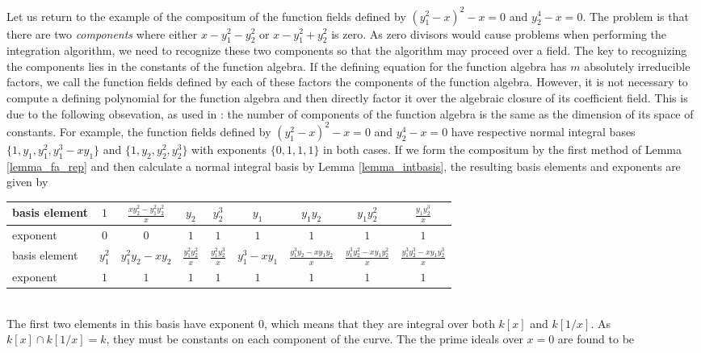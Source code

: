 \documentclass[12pt,reqno]{amsart}
\numberwithin{equation}{section}
\newcommand\T{\rule{0pt}{4.0ex}}       %
\newcommand\B{\rule[-2.5ex]{0pt}{0pt}} %
\begin{document}
Let us return to the example of the compositum of the function fields defined by $(y_1^2-x)^2-x=0$ and $y_2^4-x=0$. The problem is that there are two \emph{components} where either $x-y_1^2-y_2^2$ or $x-y_1^2+y_2^2$ is zero. As zero divisors would cause problems when performing the integration algorithm, we need to recognize these two components so that the algorithm may proceed over a field. The key to recognizing the components lies in the constants of the function algebra. If the defining equation for the function algebra has $m$ absolutely irreducible factors, we call the function fields defined by each of these factors the components of the function algebra. However, it is not necessary to compute a defining polynomial for the function algebra and then directly factor it over the algebraic closure of its coefficient field. This is due to the following obsevation, as used in \cite{duval}: the number of components of the function algebra is the same as the dimension of its space of constants. For example, the function fields defined by $(y_1^2-x)^2-x=0$ and $y_2^4-x=0$ have respective normal integral bases $\{1,y_1,y_1^2,y_1^3-x y_1\}$ and $\{1,y_2,y_2^2,y_2^3\}$ with exponents $\{0,1,1,1\}$ in both cases. If we form the compositum by the first method of Lemma \ref{lemma_fa_rep} and then calculate a normal integral basis by Lemma \ref{lemma_intbasis}, the resulting basis elements and exponents are given by
\begin{center}
\begin{tabular}{l|cccccccc}
\hline
basis element & $1$ & $\frac{x y_2^2-y_1^2 y_2^2}{x}$ & $y_2$ & $y_2^3$ & $y_1$
   & $y_1 y_2$ & $y_1 y_2^2$ & $\frac{y_1 y_2^3}{x}$\T\B\\
\hline
exponent & $0$ & $0$ & $1$ & $1$ & $1$ & $1$ & $1$ & $1$\\
\hline
basis element & $y_1^2$ & $y_1^2 y_2-x y_2$ & $\frac{y_1^2 y_2^2}{x}$ &
   $\frac{y_1^2 y_2^3}{x}$ & $y_1^3-x y_1$ & $\frac{y_1^3 y_2-x
   y_1 y_2}{x}$ & $\frac{y_1^3 y_2^2-x y_1 y_2^2}{x}$ &
   $\frac{y_1^3 y_2^3-x y_1 y_2^3}{x}$\T\B\\
\hline
exponent & $1$ & $1$ & $1$ & $1$ & $1$ & $1$ & $1$ & $1$\\
\hline\end{tabular}
\end{center}
\ \\
The first two elements in this basis have exponent $0$, which means that they are integral over both $k[x]$ and $k[1/x]$. As $k[x] \cap k[1/x] = k$, they must be constants on each component of the curve. The the prime ideals over $x=0$ are found to be
\end{document}
